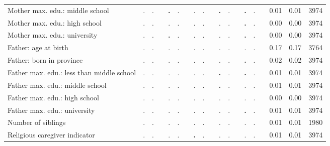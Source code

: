 \begin{tabular}{l c c c c c c c c c c c c c c c c c c}
Mother max. edu.: middle school &         . &         . & & \textbf{        .} &         . & &         . &         . & & \textbf{        .} &         . & & \textbf{        .} &         . & &      0.01 &      0.01 &      3974 \\
Mother max. edu.: high school &         . &         . & &         . &         . & &         . &         . & &         . &         . & & \textbf{        .} &         . & &      0.00 &      0.00 &      3974 \\
Mother max. edu.: university &         . &         . & & \textbf{        .} &         . & &         . &         . & &         . &         . & & \textbf{        .} &         . & &      0.00 &      0.00 &      3974 \\
Father: age at birth &         . &         . & &         . &         . & &         . &         . & &         . &         . & &         . &         . & &      0.17 &      0.17 &      3764 \\
Father: born in province &         . &         . & &         . &         . & &         . &         . & &         . &         . & & \textbf{        .} &         . & &      0.02 &      0.02 &      3974 \\
Father max. edu.: less than middle school &         . &         . & &         . &         . & &         . &         . & & \textbf{        .} &         . & & \textbf{        .} &         . & &      0.01 &      0.01 &      3974 \\
Father max. edu.: middle school &         . &         . & &         . &         . & &         . &         . & & \textbf{        .} &         . & &         . &         . & &      0.01 &      0.01 &      3974 \\
Father max. edu.: high school &         . &         . & &         . &         . & &         . &         . & &         . &         . & &         . &         . & &      0.00 &      0.00 &      3974 \\
Father max. edu.: university &         . &         . & &         . &         . & &         . &         . & &         . &         . & & \textbf{        .} &         . & &      0.01 &      0.01 &      3974 \\
Number of siblings &         . &         . & &         . &         . & &         . &         . & &         . &         . & &         . &         . & &      0.01 &      0.01 &      1980 \\
Religious caregiver indicator &         . &         . & &         . &         . & & \textbf{        .} &         . & &         . &         . & &         . &         . & &      0.01 &      0.01 &      3974 \\

\end{tabular}
